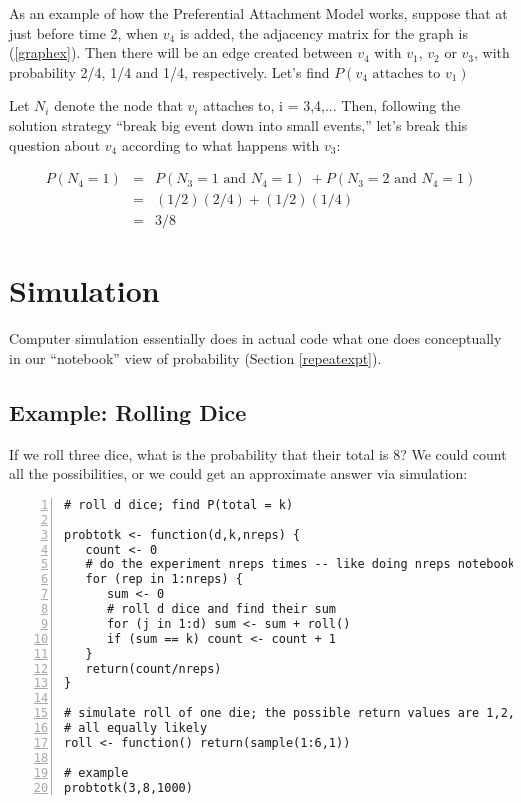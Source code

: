 As an example of how the Preferential Attachment Model works, suppose
that at just before time 2, when $v_4$ is added, the adjacency matrix
for the graph is (\ref{graphex}).  Then there will be an edge created
between $v_4$ with $v_1$, $v_2$ or $v_3$, with probability 2/4, 1/4 and
1/4, respectively.  Let's find $P(v_4 \textrm{ attaches to } v_1)$

Let $N_i$ denote the node that $v_i$ attaches to, i = 3,4,...
Then, following the solution strategy ``break big event down into small
events,'' let's break this question about $v_4$ according to what
happens with $v_3$:

\begin{eqnarray}
P(N_4 = 1)
&=& P(N_3 = 1 \textrm{ and } N_4 = 1) \
+ P(N_3 = 2 \textrm{ and } N_4 = 1) \\ 
&=& (1/2) (2/4) + (1/2) (1/4) \\
&=& 3/8
\end{eqnarray}

\section{Simulation}

Computer simulation essentially does in actual code what one does
conceptually in our ``notebook'' view of probability (Section
\ref{repeatexpt}). 

\subsection{Example:  Rolling Dice}

If we roll three dice, what is the probability that their total is 8?
We could count all the possibilities, or we could get an approximate answer
via simulation:

\begin{Verbatim}[fontsize=\relsize{-2},numbers=left]
# roll d dice; find P(total = k)

probtotk <- function(d,k,nreps) {
   count <- 0
   # do the experiment nreps times -- like doing nreps notebook lines
   for (rep in 1:nreps) {
      sum <- 0
      # roll d dice and find their sum
      for (j in 1:d) sum <- sum + roll()
      if (sum == k) count <- count + 1
   }
   return(count/nreps)
}

# simulate roll of one die; the possible return values are 1,2,3,4,5,6,
# all equally likely
roll <- function() return(sample(1:6,1))

# example
probtotk(3,8,1000)
\end{Verbatim}

